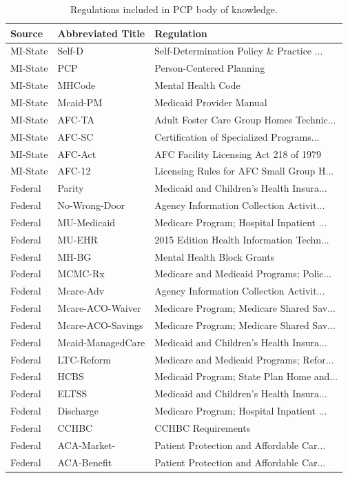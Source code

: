 \documentclass[
]{book}
\begin{document}
\begin{table}

\caption{\label{tab:unnamed-chunk-10}Regulations included in PCP body of knowledge.}
\centering
\begin{tabular}[t]{l|l|l}
\hline
Source & Abbreviated Title & Regulation\\
\hline
MI-State & Self-D & Self-Determination Policy \& Practice ...\\
\hline
MI-State & PCP & Person-Centered Planning\\
\hline
MI-State & MHCode & Mental Health Code\\
\hline
MI-State & Mcaid-PM & Medicaid Provider Manual\\
\hline
MI-State & AFC-TA & Adult Foster Care Group Homes Technic...\\
\hline
MI-State & AFC-SC & Certification of Specialized Programs...\\
\hline
MI-State & AFC-Act & AFC Facility Licensing Act 218 of 1979\\
\hline
MI-State & AFC-12 & Licensing Rules for AFC Small Group H...\\
\hline
Federal & Parity & Medicaid and Children's Health Insura...\\
\hline
Federal & No-Wrong-Door & Agency Information Collection Activit...\\
\hline
Federal & MU-Medicaid & Medicare Program; Hospital Inpatient ...\\
\hline
Federal & MU-EHR & 2015 Edition Health Information Techn...\\
\hline
Federal & MH-BG & Mental Health Block Grants\\
\hline
Federal & MCMC-Rx & Medicare and Medicaid Programs; Polic...\\
\hline
Federal & Mcare-Adv & Agency Information Collection Activit...\\
\hline
Federal & Mcare-ACO-Waiver & Medicare Program; Medicare Shared Sav...\\
\hline
Federal & Mcare-ACO-Savings & Medicare Program; Medicare Shared Sav...\\
\hline
Federal & Mcaid-ManagedCare & Medicaid and Children's Health Insura...\\
\hline
Federal & LTC-Reform & Medicare and Medicaid Programs; Refor...\\
\hline
Federal & HCBS & Medicaid Program; State Plan Home and...\\
\hline
Federal & ELTSS & Medicaid and Children's Health Insura...\\
\hline
Federal & Discharge & Medicare Program; Hospital Inpatient ...\\
\hline
Federal & CCHBC & CCHBC Requirements\\
\hline
Federal & ACA-Market- & Patient Protection and Affordable Car...\\
\hline
Federal & ACA-Benefit & Patient Protection and Affordable Car...\\
\hline
\end{tabular}
\end{table}
\end{document}
